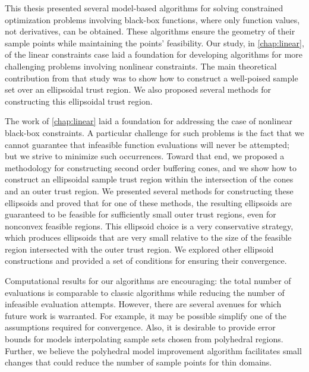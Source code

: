 This thesis presented several model-based algorithms for solving constrained optimization problems involving black-box functions, 
where only function values, not derivatives, can be obtained.
These algorithms ensure the geometry of their sample points while maintaining the points' feasibility.
Our study, in \cref{chap:linear}, of the linear constraints case laid a foundation for developing algorithms for more
challenging problems involving nonlinear constraints.  
The main theoretical contribution from that study was to show how to construct a well-poised sample set over an ellipsoidal trust region.
We also proposed several methods for constructing this ellipsoidal trust region.

The work of \cref{chap:linear} laid a foundation for addressing the case of nonlinear black-box constraints.
A particular challenge for such problems is the fact that we cannot guarantee that infeasible function evaluations will never be attempted;
but we strive to minimize such occurrences.
Toward that end, we proposed a methodology for constructing second order buffering cones, 
and we show how to construct an ellipsoidal sample trust region within the intersection of the cones and an outer trust region.
We presented several methods for constructing these ellipsoids and proved that for one of these methods,
the resulting ellipsoids are guaranteed to be feasible for sufficiently small outer trust regions, even for nonconvex feasible regions.
This ellipsoid choice is a very conservative strategy, 
which produces ellipsoids that are very small relative to the size of the feasible region intersected with the outer trust region.
We explored other ellipsoid constructions and provided a set of conditions for ensuring their convergence.

Computational results for our algorithms are encouraging: 
the total number of evaluations is comparable to classic algorithms while reducing the number of infeasible evaluation attempts.
However, there are several avenues for which future work is warranted.
For example, it may be possible simplify one of the assumptions required for convergence.
Also, it is desirable to provide error bounds for models interpolating sample sets chosen from polyhedral regions.
Further, we believe the polyhedral model improvement algorithm facilitates small changes that could reduce the number of sample points for thin domains.



